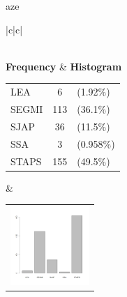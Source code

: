  aze 
  \begin{center}
    \addtolength{\leftskip}{-4cm}\addtolength{\rightskip}{-4cm}
    \begin{tabular}{|c|c|}

      \hline
        \\
      \hline
        {\bf Frequency} & {\bf Histogram}  \\
          \begin{tabular}{@{}l@{ : }cl@{}}
            LEA & 6 &(1.92\%) \\
            SEGMI & 113 &(36.1\%) \\
            SJAP & 36 &(11.5\%) \\
            SSA & 3 &(0.958\%) \\
            STAPS & 155 &(49.5\%) \\
          \end{tabular}
      &
          \begin{tabular}{@{}l@{}}
            \includegraphics[width=3cm]{graphUniv/V5-barplot}
          \end{tabular}
      \\ \hline 

    \end{tabular}
  \end{center}
  
  




